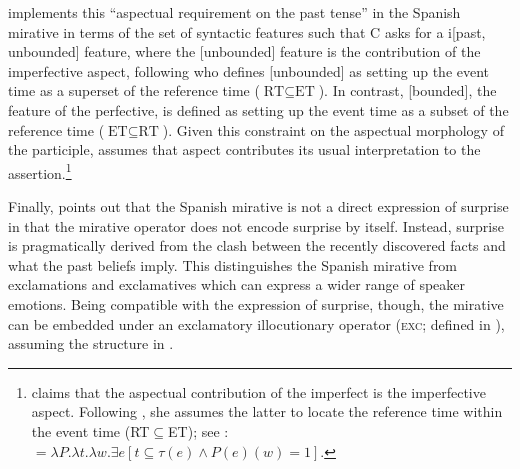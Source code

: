 \documentclass[output=paper,
colorlinks,
citecolor=brown,
newtxmath
]{langscibook}
\begin{document}
\citet[115]{Bustamante2013} implements this ``aspectual requirement on the past tense'' in the Spanish mirative in terms of the set of syntactic features such that C asks for a i[past, unbounded] feature, where the [unbounded] feature is the
contribution of the imperfective aspect, following \citet{Pancheva2003} who defines [unbounded] as setting up the event time as a superset of the reference time ($\text{RT}\subseteq\text{ET}$). In contrast, [bounded], the feature of the perfective, is defined as setting up the event time as a subset of the reference time ($\text{ET}\subseteq\text{RT}$).
Given this constraint on the aspectual morphology of the participle, \citet[51]{Bustamante2013} assumes that aspect contributes its usual interpretation to the assertion.\footnote{\label{fn:34} \citet[51--52]{Bustamante2013} claims that the aspectual contribution of the imperfect is the imperfective aspect. Following \citet{Kratzer1998}, she assumes the latter to locate the reference time within the event time (RT$\subseteq$ET); see :
\ea\label{def:imperfect}
 $ = \lambda P.\lambda t.\lambda w. \exists e [t \subseteq \tau(e) \wedge P(e)(w)=1]$.
\z}




Finally, \cite[14]{Bustamante2013} points out that the Spanish mirative is not a direct expression of surprise in that the mirative operator does not encode surprise by itself. Instead, surprise is pragmatically derived from the clash between the recently discovered facts and what the past beliefs imply. This distinguishes the Spanish mirative from exclamations and exclamatives which can express a wider range of speaker emotions. Being compatible with the expression of surprise, though, the mirative can be embedded under an exclamatory illocutionary operator (\textsc{exc}; defined in \citealt{Gutierrez-Rexach1996}), assuming the structure in .
\end{document}
